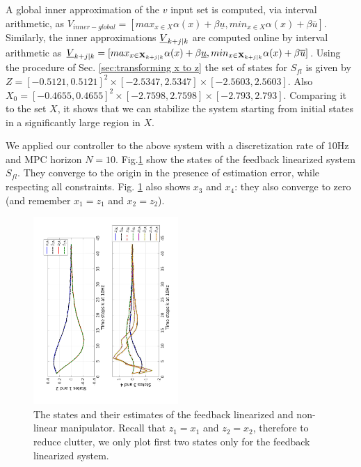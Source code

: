 
A global inner approximation of the $v$ input set is computed, via interval arithmetic, as $V_{inner-global} = [max_{x\in X}\alpha(x) + \beta \underline{u}, min_{x\in X}\alpha(x) + \beta \overline{u}]$. 
Similarly, the inner approximations $\underline{V}_{k+j|k}$ are computed online by interval arithmetic as $\underline{V}_{k+j|k} = [max_{x\in \mathbf{X}_{k+j|k}} \alpha(x) + \beta \underline{u},  min_{x\in \mathbf{X}_{k+j|k}}\alpha(x) + \beta \overline{u}]$. 
Using the procedure of Sec. \ref{sec:transforming x to z} the set of states for $S_{fl}$ is given by $Z = [-0.5121, 0.5121]^2 \times [-2.5347, 2.5347] \times [-2.5603, 2.5603]$. Also $X_0 = [-0.4655,0.4655]^2 \times [-2.7598,2.7598] \times [-2.793,2.793]$. Comparing it to the set $X$, it shows that we can stabilize the system starting from initial states in a significantly large region in $X$.

We applied our controller to the above system with a discretization rate of 10Hz and MPC horizon $N=10$.
Fig.\ref{fig:AllStates_manip} show the states of the feedback linearized system $S_{fl}$. 
They converge to the origin in the presence of estimation error, while respecting all constraints.
Fig. \ref{fig:AllStates_manip} also shows $x_3$ and $x_4$: they also converge to zero (and remember $x_1 = z_1$ and $x_2 = z_2$).

\begin{figure}
\includegraphics[angle=270,width=0.49\textwidth]{figs/AllStates_manip.pdf}
\caption{The states and their estimates of the feedback linearized and non-linear manipulator. Recall that $z_1 = x_1$ and $z_2=x_2$, therefore to reduce clutter, we only plot first two states only for the feedback linearized system.}
\label{fig:AllStates_manip}
\end{figure}

